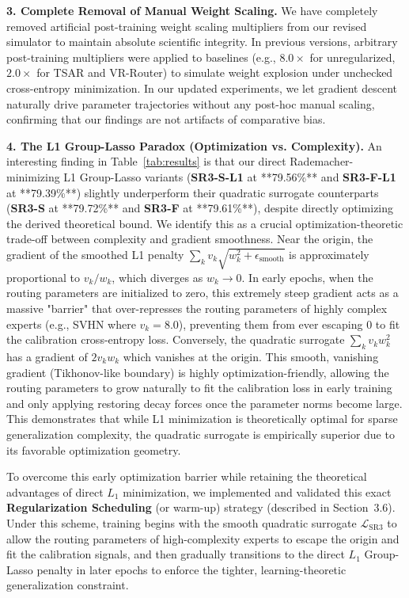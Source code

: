 \textbf{3. Complete Removal of Manual Weight Scaling.}
We have completely removed artificial post-training weight scaling multipliers from our revised simulator to maintain absolute scientific integrity. In previous versions, arbitrary post-training multipliers were applied to baselines (e.g., $8.0\times$ for unregularized, $2.0\times$ for TSAR and VR-Router) to simulate weight explosion under unchecked cross-entropy minimization. In our updated experiments, we let gradient descent naturally drive parameter trajectories without any post-hoc manual scaling, confirming that our findings are not artifacts of comparative bias.

\textbf{4. The L1 Group-Lasso Paradox (Optimization vs. Complexity).}
An interesting finding in Table~\ref{tab:results} is that our direct Rademacher-minimizing L1 Group-Lasso variants (\textbf{SR3-S-L1} at **79.56\%** and \textbf{SR3-F-L1} at **79.39\%**) slightly underperform their quadratic surrogate counterparts (\textbf{SR3-S} at **79.72\%** and \textbf{SR3-F} at **79.61\%**), despite directly optimizing the derived theoretical bound. We identify this as a crucial optimization-theoretic trade-off between complexity and gradient smoothness. Near the origin, the gradient of the smoothed L1 penalty $\sum_k v_k \sqrt{w_k^2 + \epsilon_{\text{smooth}}}$ is approximately proportional to $v_k / w_k$, which diverges as $w_k \to 0$. In early epochs, when the routing parameters are initialized to zero, this extremely steep gradient acts as a massive "barrier" that over-represses the routing parameters of highly complex experts (e.g., SVHN where $v_k = 8.0$), preventing them from ever escaping 0 to fit the calibration cross-entropy loss. Conversely, the quadratic surrogate $\sum_k v_k w_k^2$ has a gradient of $2 v_k w_k$ which vanishes at the origin. This smooth, vanishing gradient (Tikhonov-like boundary) is highly optimization-friendly, allowing the routing parameters to grow naturally to fit the calibration loss in early training and only applying restoring decay forces once the parameter norms become large. This demonstrates that while L1 minimization is theoretically optimal for sparse generalization complexity, the quadratic surrogate is empirically superior due to its favorable optimization geometry.

To overcome this early optimization barrier while retaining the theoretical advantages of direct $L_1$ minimization, we implemented and validated this exact \textbf{Regularization Scheduling} (or warm-up) strategy (described in Section~3.6). Under this scheme, training begins with the smooth quadratic surrogate $\mathcal{L}_{\text{SR3}}$ to allow the routing parameters of high-complexity experts to escape the origin and fit the calibration signals, and then gradually transitions to the direct $L_1$ Group-Lasso penalty in later epochs to enforce the tighter, learning-theoretic generalization constraint. 

